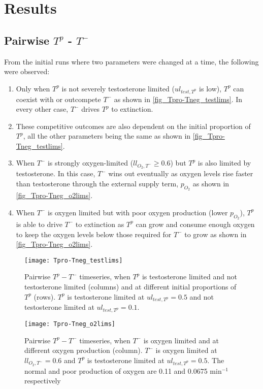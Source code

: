 \chapter{Results}

\section{Pairwise $T^p$ - $T^-$}
From the initial runs where two parameters were changed at a time, the following were observed:
\begin{enumerate}
  \item Only when $T^p$ is not severely testosterone limited ($ul_{test,T^p}$ is low), $T^p$ can coexist with or outcompete $T^-$ as shown in \autoref{fig_Tpro-Tneg_testlims}. In every other case, $T^-$ drives $T^p$ to extinction.
  \item These competitive outcomes are also dependent on the initial proportion of $T^p$, all the other parameters being the same as shown in  \autoref{fig_Tpro-Tneg_testlims}.
  \item  When $T^-$ is strongly oxygen-limited ($ll_{O_2,T^-} \geq 0.6$) but $T^p$ is also limited by testosterone. In this case, $T^-$ wins out eventually as oxygen levels rise faster than testosterone through the external supply term, $p_{O_2}$ as shown in \autoref{fig_Tpro-Tneg_o2lims}.
  \item When $T^-$ is oxygen limited but with poor oxygen production (lower $p_{O_2}$), $T^p$ is able to drive $T^-$ to extinction as $T^p$ can grow and consume enough oxygen to keep the oxygen levels below those required for $T^-$ to grow as shown in \autoref{fig_Tpro-Tneg_o2lims}.
\end{enumerate}

\begin{figure}[h!]
  \centering
  \texttt{[image: Tpro-Tneg\_testlims]}
  \caption[Pairwise $T^p - T^-$ timeseries, testosterone limitation]{Pairwise $T^p - T^-$ timeseries, when $T^p$ is testosterone limited and not testosterone limited (columns) and at different initial proportions of $T^p$ (rows). $T^p$ is testosterone limited at $ul_{test,T^p}=0.5$ and not testosterone limited at $ul_{test,T^p}=0.1$.}
  \label{fig_Tpro-Tneg_testlims}
\end{figure}

\begin{figure}[h!]
  \centering
  \texttt{[image: Tpro-Tneg\_o2lims]}
  \caption[Pairwise $T^p - T^-$ timeseries, oxygen limitation]{Pairwise $T^p - T^-$ timeseries, when $T^-$ is oxygen limited and at different oxygen production (column). $T^-$ is oxygen limited at $ll_{O_2,T^-}=0.6$ and $T^p$ is testosterone limited at $ul_{test,T^p}=0.5$. The normal and poor production of oxygen are 0.11 and 0.0675 min$^{-1}$ respectively}
  \label{fig_Tpro-Tneg_o2lims}
\end{figure}

